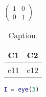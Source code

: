 $\begin{pmatrix} 1&0\\0&1 \end{pmatrix}$

\begin{table}[ht]
\centering
\caption{Caption.}
\begin{tabular}{cl}
\toprule
\textbf{C1} & \textbf{C2} \\
\midrule
c11 & c12 \\
\bottomrule
\end{tabular}
\label{tab:x}
\end{table}

\begin{lstlisting}[language=Matlab] I = eye(3) \end{lstlisting}
\lstset{language=Matlab} 

